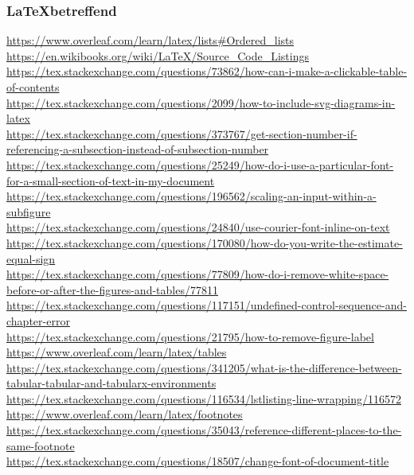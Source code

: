 \documentclass{article}
\begin{document}
    \subsubsection{\LaTeX\space betreffend}
    \url{https://www.overleaf.com/learn/latex/lists\#Ordered\_lists}\\
    \url{https://en.wikibooks.org/wiki/LaTeX/Source\_Code\_Listings}\\
    \url{https://tex.stackexchange.com/questions/73862/how-can-i-make-a-clickable-table-of-contents}\\
    \url{https://tex.stackexchange.com/questions/2099/how-to-include-svg-diagrams-in-latex}\\
    \url{https://tex.stackexchange.com/questions/373767/get-section-number-if-referencing-a-subsection-instead-of-subsection-number}\\
    \url{https://tex.stackexchange.com/questions/25249/how-do-i-use-a-particular-font-for-a-small-section-of-text-in-my-document}\\
    \url{https://tex.stackexchange.com/questions/196562/scaling-an-input-within-a-subfigure}\\
    \url{https://tex.stackexchange.com/questions/24840/use-courier-font-inline-on-text}\\
    \url{https://tex.stackexchange.com/questions/170080/how-do-you-write-the-estimate-equal-sign}\\
    \url{https://tex.stackexchange.com/questions/77809/how-do-i-remove-white-space-before-or-after-the-figures-and-tables/77811}\\
    \url{https://tex.stackexchange.com/questions/117151/undefined-control-sequence-and-chapter-error}\\
    \url{https://tex.stackexchange.com/questions/21795/how-to-remove-figure-label}\\
    \url{https://www.overleaf.com/learn/latex/tables}\\
    \url{https://tex.stackexchange.com/questions/341205/what-is-the-difference-between-tabular-tabular-and-tabularx-environments}\\
    \url{https://tex.stackexchange.com/questions/116534/lstlisting-line-wrapping/116572}\\
    \url{https://www.overleaf.com/learn/latex/footnotes}\\
    \url{https://tex.stackexchange.com/questions/35043/reference-different-places-to-the-same-footnote}\\
    \url{https://tex.stackexchange.com/questions/18507/change-font-of-document-title}\\
\end{document}
